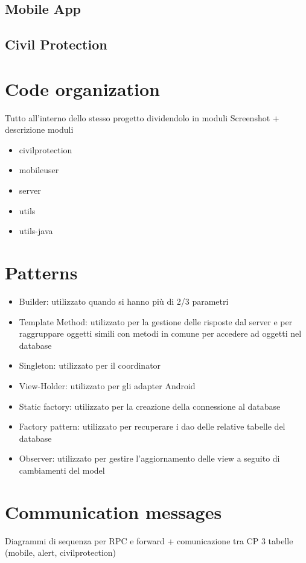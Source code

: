\documentclass[a4paper,12pt]{report}
\begin{document}
\subsection{Mobile App}
\subsection{Civil Protection}

\section{Code organization}
Tutto all'interno dello stesso progetto dividendolo in moduli
Screenshot + descrizione moduli
\begin{itemize}
\item civilprotection
\item mobileuser
\item server
\item utils
\item utils-java
\end{itemize}

\section{Patterns}
\begin{itemize}
\item Builder: utilizzato quando si hanno più di 2/3 parametri
\item Template Method: utilizzato per la gestione delle risposte dal server e per raggruppare oggetti simili con metodi in comune per accedere ad oggetti nel database
\item Singleton: utilizzato per il coordinator
\item View-Holder: utilizzato per gli adapter Android
\item Static factory: utilizzato per la creazione della connessione al database
\item Factory pattern: utilizzato per recuperare i dao delle relative tabelle del database
\item Observer: utilizzato per gestire l'aggiornamento delle view a seguito di cambiamenti del model
\end{itemize}

\section{Communication messages}
Diagrammi di sequenza per RPC e forward + comunicazione tra CP
3 tabelle (mobile, alert, civilprotection)
\end{document}
